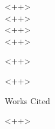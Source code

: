 \documentclass[12pt]{article}
\newcommand{\bibent}{\noindent \hangindent 40pt}
\newenvironment{workscited}{\newpage \begin{center} Works Cited \end{center}}{\newpage }
\begin{document}
\begin{flushleft}

<++>\\ %
<++>\\ %
<++>\\ %
<++>\\ %

\begin{center}
<++>
\end{center}

\setlength{\parindent}{0.5in}


<++>

\newpage

\begin{workscited}

\bibent
<++>

\end{workscited}

\end{flushleft}
\end{document}

